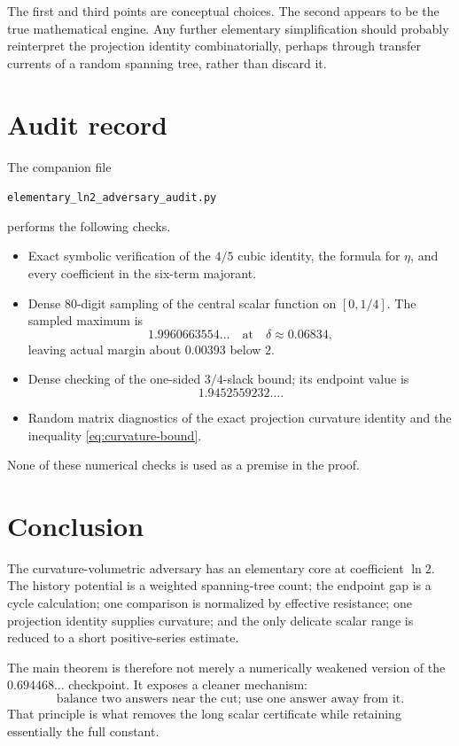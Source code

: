 \documentclass[11pt]{article}
\theoremstyle{definition}
\newcommand{\1}{\mathbf{1}}
\begin{document}
The first and third points are conceptual choices.  The second appears to be the true mathematical engine.  Any further elementary simplification should probably reinterpret the projection identity combinatorially, perhaps through transfer currents of a random spanning tree, rather than discard it.

\section{Audit record}

The companion file
\begin{center}
\texttt{elementary\_ln2\_adversary\_audit.py}
\end{center}
performs the following checks.

\begin{itemize}[leftmargin=2em]
\item Exact symbolic verification of the $4/5$ cubic identity, the formula for $\eta$, and every coefficient in the six-term majorant.
\item Dense $80$-digit sampling of the central scalar function on $[0,1/4]$.  The sampled maximum is
\[
1.9960663554\ldots
\quad\text{at}\quad
\delta\approx0.06834,
\]
leaving actual margin about $0.00393$ below $2$.
\item Dense checking of the one-sided $3/4$-slack bound; its endpoint value is
\[
1.9452559232\ldots .
\]
\item Random matrix diagnostics of the exact projection curvature identity and the inequality \eqref{eq:curvature-bound}.
\end{itemize}

None of these numerical checks is used as a premise in the proof.

\section{Conclusion}

The curvature-volumetric adversary has an elementary core at coefficient $\ln2$.  The history potential is a weighted spanning-tree count; the endpoint gap is a cycle calculation; one comparison is normalized by effective resistance; one projection identity supplies curvature; and the only delicate scalar range is reduced to a short positive-series estimate.

The main theorem is therefore not merely a numerically weakened version of the $0.694468\ldots$ checkpoint.  It exposes a cleaner mechanism:
\[
\boxed{\text{balance two answers near the cut; use one answer away from it.}}
\]
That principle is what removes the long scalar certificate while retaining essentially the full constant.
\end{document}
